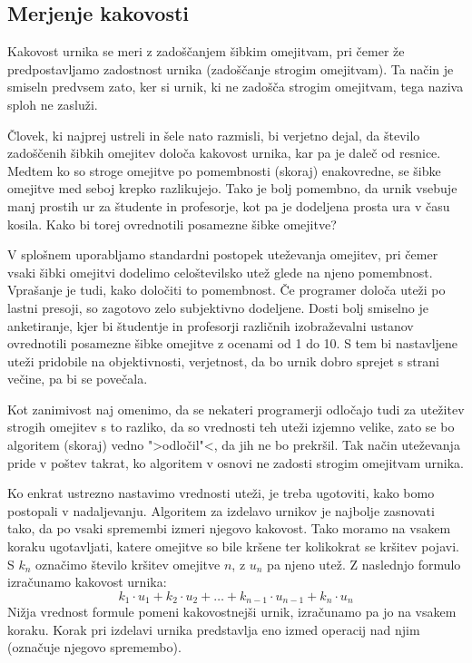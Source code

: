 \documentclass[a4paper,10pt]{article}
\begin{document}
\subsection{Merjenje kakovosti}

Kakovost urnika se meri z zadoščanjem šibkim omejitvam, pri čemer že predpostavljamo
zadostnost urnika (zadoščanje strogim omejitvam). Ta način je smiseln predvsem zato,
ker si urnik, ki ne zadošča strogim omejitvam, tega naziva sploh ne zasluži.

Človek, ki najprej ustreli in šele nato razmisli, bi verjetno dejal, da število
zadoščenih šibkih omejitev določa kakovost urnika, kar pa je daleč od resnice. Medtem
ko so stroge omejitve po pomembnosti (skoraj) enakovredne, se šibke omejitve med seboj
krepko razlikujejo. Tako je bolj pomembno, da urnik vsebuje manj prostih ur za
študente in profesorje, kot pa je dodeljena prosta ura v času kosila. Kako bi torej
ovrednotili posamezne šibke omejitve?

V splošnem uporabljamo standardni postopek uteževanja omejitev, pri čemer vsaki šibki
omejitvi dodelimo celoštevilsko utež glede na njeno pomembnost. Vprašanje je tudi, kako
določiti to pomembnost. Če programer določa uteži po lastni presoji, so zagotovo zelo
subjektivno dodeljene. Dosti bolj smiselno je anketiranje, kjer bi študentje in profesorji
različnih izobraževalni ustanov ovrednotili posamezne šibke omejitve z ocenami od 1 do 10.
S tem bi nastavljene uteži pridobile na objektivnosti, verjetnost, da bo urnik dobro
sprejet s strani večine, pa bi se povečala.

Kot zanimivost naj omenimo, da se nekateri programerji odločajo tudi za utežitev strogih
omejitev s to razliko, da so vrednosti teh uteži izjemno velike, zato se bo algoritem
(skoraj) vedno ">odločil"<, da jih ne bo prekršil. Tak način uteževanja pride v poštev
takrat, ko algoritem v osnovi ne zadosti strogim omejitvam urnika.

Ko enkrat ustrezno nastavimo vrednosti uteži, je treba ugotoviti, kako bomo postopali
v nadaljevanju. Algoritem za izdelavo urnikov je najbolje zasnovati tako, da po vsaki
spremembi izmeri njegovo kakovost. Tako moramo na vsakem koraku ugotavljati, katere
omejitve so bile kršene ter kolikokrat se kršitev pojavi. S \(k_n\) označimo število
kršitev omejitve \(n\), z \(u_n\) pa njeno utež. Z naslednjo formulo izračunamo
kakovost urnika:
\[k_1\cdot u_1+k_2\cdot u_2+ \ldots +k_{n-1}\cdot u_{n-1}+k_n\cdot u_n\]
Nižja vrednost formule pomeni kakovostnejši urnik, izračunamo pa jo na vsakem koraku.
Korak pri izdelavi urnika predstavlja eno izmed operacij nad njim (označuje njegovo
spremembo).
\end{document}
